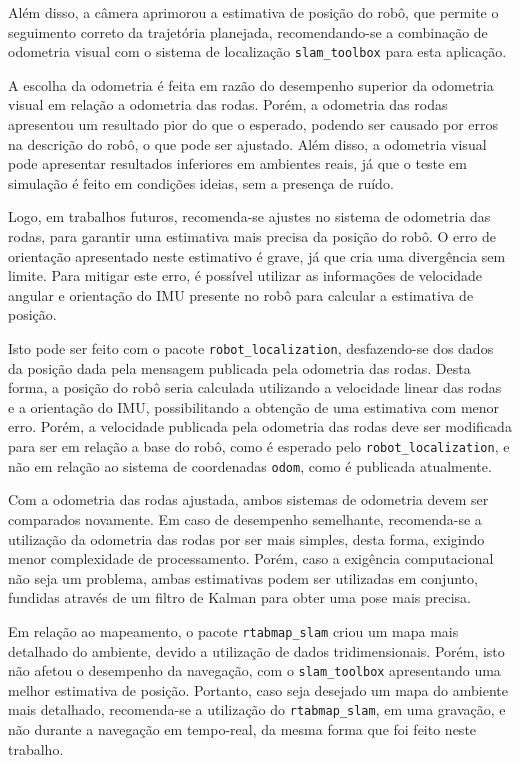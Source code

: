 \documentclass[repeatfields,xlists,xpacks,oneside,yearsonly]{ufrgscca}
\begin{document}
Além disso, a câmera aprimorou a estimativa de posição do robô, que
permite o seguimento correto da trajetória planejada, recomendando-se
a combinação de odometria visual com o sistema de localização
\texttt{slam\_toolbox} para esta aplicação.

A escolha da odometria é feita em razão do desempenho superior da
odometria visual em relação a odometria das rodas. Porém, a odometria
das rodas apresentou um resultado pior do que o esperado, podendo ser
causado por erros na descrição do robô, o que pode ser ajustado. Além
disso, a odometria visual pode apresentar resultados inferiores em
ambientes reais, já que o teste em simulação é feito em condições
ideias, sem a presença de ruído.

Logo, em trabalhos futuros, recomenda-se ajustes no sistema de
odometria das rodas, para garantir uma estimativa mais precisa da
posição do robô. O erro de orientação apresentado neste estimativo é
grave, já que cria uma divergência sem limite. Para mitigar este
erro, é possível utilizar as informações de velocidade angular e
orientação do IMU presente no robô para calcular a estimativa de
posição.

Isto pode ser feito com o pacote \texttt{robot\_localization},
desfazendo-se dos dados da posição dada pela mensagem publicada pela
odometria das rodas. Desta forma, a posição do robô seria calculada
utilizando a velocidade linear das rodas e a orientação do IMU,
possibilitando a obtenção de uma estimativa com menor erro. Porém, a
velocidade publicada pela odometria das rodas deve ser modificada
para ser em relação a base do robô, como é esperado pelo
\texttt{robot\_localization}, e não em relação ao sistema de
coordenadas \texttt{odom}, como é publicada atualmente.

Com a odometria das rodas ajustada, ambos sistemas de odometria devem
ser comparados novamente. Em caso de desempenho semelhante,
recomenda-se a utilização da odometria das rodas por ser mais
simples, desta forma, exigindo menor complexidade de processamento.
Porém, caso a exigência computacional não seja um problema, ambas
estimativas podem ser utilizadas em conjunto, fundidas através de um
filtro de Kalman para obter uma pose mais precisa.

Em relação ao mapeamento, o pacote \texttt{rtabmap\_slam} criou um
mapa mais detalhado do ambiente, devido a utilização de dados
tridimensionais. Porém, isto não afetou o desempenho da navegação,
com o \texttt{slam\_toolbox} apresentando uma melhor estimativa de
posição. Portanto, caso seja desejado um mapa do ambiente mais
detalhado, recomenda-se a utilização do \texttt{rtabmap\_slam}, em
uma gravação, e não durante a navegação em tempo-real, da mesma forma
que foi feito neste trabalho.
\end{document}
